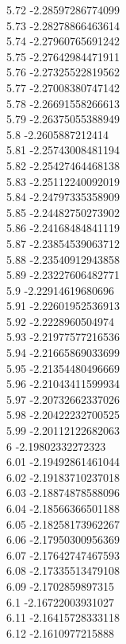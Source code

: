{5.72	-2.28597286774099\\
5.73	-2.28278866463614\\
5.74	-2.27960765691242\\
5.75	-2.27642984471911\\
5.76	-2.27325522819562\\
5.77	-2.27008380747142\\
5.78	-2.26691558266613\\
5.79	-2.26375055388949\\
5.8	-2.2605887212414\\
5.81	-2.25743008481194\\
5.82	-2.25427464468138\\
5.83	-2.25112240092019\\
5.84	-2.24797335358909\\
5.85	-2.24482750273902\\
5.86	-2.24168484841119\\
5.87	-2.23854539063712\\
5.88	-2.23540912943858\\
5.89	-2.23227606482771\\
5.9	-2.22914619680696\\
5.91	-2.22601952536913\\
5.92	-2.2228960504974\\
5.93	-2.21977577216536\\
5.94	-2.21665869033699\\
5.95	-2.21354480496669\\
5.96	-2.21043411599934\\
5.97	-2.20732662337026\\
5.98	-2.20422232700525\\
5.99	-2.20112122682063\\
6	-2.19802332272323\\
6.01	-2.19492861461044\\
6.02	-2.19183710237018\\
6.03	-2.18874878588096\\
6.04	-2.18566366501188\\
6.05	-2.18258173962267\\
6.06	-2.17950300956369\\
6.07	-2.17642747467593\\
6.08	-2.17335513479108\\
6.09	-2.1702859897315\\
6.1	-2.16722003931027\\
6.11	-2.16415728333118\\
6.12	-2.1610977215888\\
}
